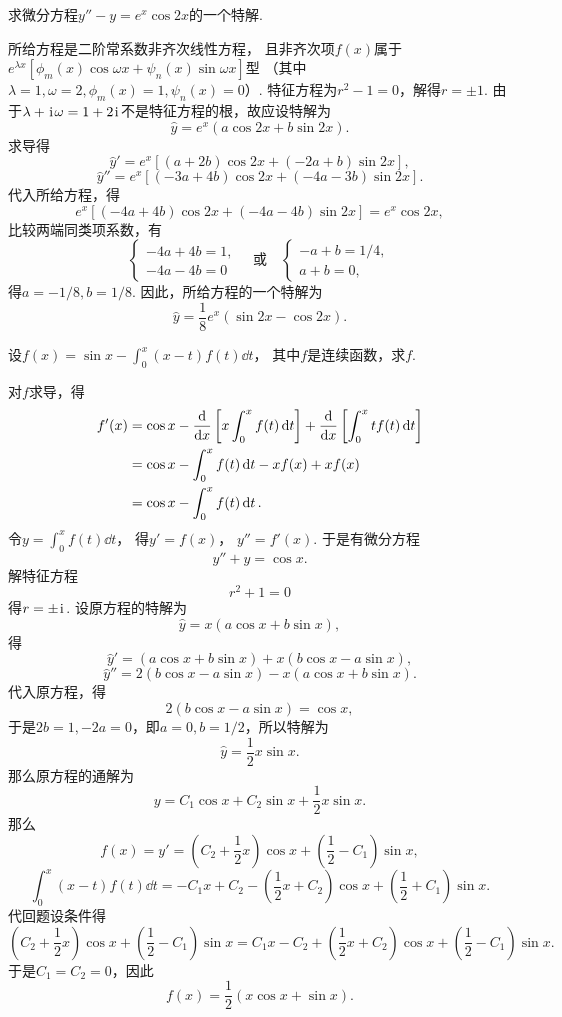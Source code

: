 \begin{example}
求微分方程\(y''-y=e^x \cos2x\)的一个特解.
\begin{solution}
所给方程是二阶常系数非齐次线性方程，
且非齐次项\(f(x)\)属于\(e^{\lambda x} [\phi_m(x) \cos\omega x + \psi_n(x) \sin\omega x]\)型
（其中\(\lambda=1,
\omega=2,
\phi_m(x) = 1,
\psi_n(x) = 0\)）.
特征方程为\(r^2-1=0\)，解得\(r=\pm1\).
由于\(\lambda+\kern1pt\mathrm{i}\kern1pt\omega=1+2\kern1pt\mathrm{i}\kern1pt\)不是特征方程的根，故应设特解为\[
\hat{y} = e^x (a \cos2x + b \sin2x).
\]
求导得\[
\hat{y}' = e^x [(a+2b) \cos2x + (-2a+b) \sin2x],
\]\[
\hat{y}'' = e^x [(-3a+4b) \cos2x + (-4a-3b) \sin2x].
\]
代入所给方程，得\[
e^x [(-4a+4b) \cos2x + (-4a-4b) \sin2x]
= e^x \cos2x,
\]
比较两端同类项系数，有\[
\left\{ \begin{array}{l}
	-4a+4b=1, \\
	-4a-4b=0
\end{array} \right.
\quad\text{或}\quad
\left\{ \begin{array}{l}
	-a+b=1/4, \\
	a+b=0,
\end{array} \right.
\]
得\(a = -1/8,
b = 1/8\).
因此，所给方程的一个特解为\[
\hat{y} = \frac{1}{8} e^x (\sin2x - \cos2x).
\]
\end{solution}
\end{example}

\begin{example}
设\(f(x) = \sin x - \int_0^x (x-t) f(t) \dd{t}\)，
其中\(f\)是连续函数，求\(f\).
\begin{solution}
对\(f\)求导，得\[
\begin{split}
f'(x)
&= \cos x - \dv{x}\left[ x \int_0^x f(t) \dd{t} \right] + \dv{x}\left[\int_0^x t f(t) \dd{t}\right] \\
&= \cos x - \int_0^x f(t) \dd{t} - x f(x) + x f(x) \\
&= \cos x - \int_0^x f(t) \dd{t}.
\end{split}
\]
令\(y = \int_0^x f(t) \dd{t}\)，
得\(y' = f(x)\)，
\(y'' = f'(x)\).
于是有微分方程\[
y'' + y = \cos x.
\]
解特征方程\[
r^2 + 1 = 0
\]得\(r = \pm\kern1pt\mathrm{i}\kern1pt\).
设原方程的特解为\[
\hat{y} = x(a \cos x + b \sin x),
\]得\[
\hat{y}' = (a \cos x + b \sin x)
			+ x(b \cos x - a \sin x),
\]\[
\hat{y}'' = 2(b \cos x - a \sin x)
			- x(a \cos x + b \sin x).
\]
代入原方程，得\[
2(b \cos x - a \sin x)
= \cos x,
\]
于是\(2b = 1, -2a = 0\)，即\(a=0, b=1/2\)，所以特解为\[
\hat{y} = \frac{1}{2} x \sin x.
\]
那么原方程的通解为\[
y = C_1 \cos x + C_2 \sin x + \frac{1}{2} x \sin x.
\]
那么\[
f(x) = y'
= \left( C_2 + \frac{1}{2} x \right) \cos x + \left( \frac{1}{2} - C_1 \right) \sin x,
\]\[
\int_0^x (x-t) f(t) \dd{t}
= -C_1 x + C_2 - \left(\frac{1}{2}x+C_2\right) \cos x + \left(\frac{1}{2}+C_1\right) \sin x.
\]
代回题设条件得\[
\left( C_2 + \frac{1}{2} x \right) \cos x + \left( \frac{1}{2} - C_1 \right) \sin x
= C_1 x - C_2 + \left(\frac{1}{2} x + C_2\right) \cos x + \left(\frac{1}{2}-C_1\right) \sin x.
\]
于是\(C_1 = C_2 = 0\)，因此\[
f(x) = \frac{1}{2} (x \cos x + \sin x).
\]
\end{solution}
\end{example}

